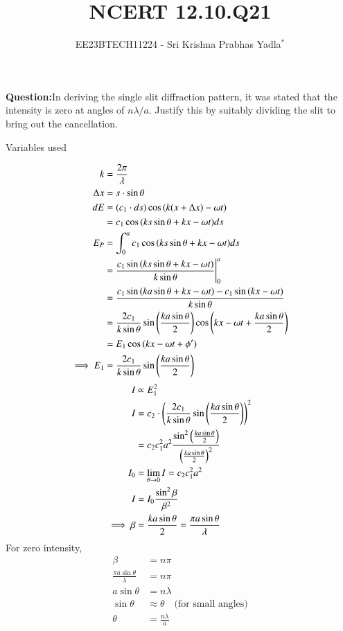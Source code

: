\documentclass[journal,12pt,twocolumn]{IEEEtran}
\theoremstyle{remark}
\begin{document}

\vspace{3cm}

\title{NCERT 12.10.Q21}
\author{EE23BTECH11224 - Sri Krishna Prabhas Yadla$^{*}$%
}
\maketitle
\newpage
\bigskip

\renewcommand{\thefigure}{\arabic{figure}}
\renewcommand{\thetable}{\arabic{table}}


\vspace{3cm}
\textbf{Question:}In deriving the single slit diffraction pattern, it was stated that the intensity is zero at angles of $n\lambda/a$. Justify this by suitably dividing the slit to bring out the cancellation.
\\
\solution
\begin{table}[htbp]
\centering
\def\arraystrech{1.5}

\caption{Variables used}
\label{tab:1.12_10_Q21}
\end{table}
\begin{align}
    k &= \frac{2\pi}{\lambda} \\
\Delta x &= s\cdot \sin{\theta}\\
    dE &= (c_1\cdot ds)\cos{(k(x+\Delta x)-\omega t)} \\
    &= c_1 \cos{(ks\sin{\theta} + kx-\omega t)} ds \\
    E_P &= \int_{0}^{a} c_1\cos{(ks\sin{\theta} + kx-\omega t)} ds \\
    &= \frac{c_1 \sin{(ks\sin{\theta} + kx-\omega t)}}{k\sin{\theta}}\Bigg|_{0}^{a}   \\
    &= \frac{c_1 \sin{(ka\sin{\theta} + kx-\omega t)}-c_1\sin{(kx-\omega t)}}{k\sin{\theta}} \\
    &= \frac{2c_1}{k\sin{\theta}}\sin{ \ensuremath{\left(\frac{ka\sin{\theta}}{2}\right)}}\cos{\ensuremath{\left(kx-\omega t+ \frac{ka\sin{\theta}}{2}\right)}} \\
    &= E_1 \cos{(kx-\omega t+ \phi')} \\
    \implies E_1 &= \frac{2c_1}{k\sin{\theta}}\sin{ \ensuremath{\left(\frac{ka\sin{\theta}}{2}\right)}}
\end{align}
\begin{align}
    I &\propto E_1^2  \\
    I &= c_2 \cdot \left(\frac{2c_1}{k\sin{\theta}}\sin{ \ensuremath{\left( \frac{ka\sin{\theta}}{2}\right)}}\right)^2 \\
    &= c_2c_1^2a^2 \frac{\sin^2{\left(\frac{ka\sin{\theta}}{2}\right)}}{\left(\frac{ka\sin{\theta}}{2}\right)^2}\\
    I_0 &= \lim_{\theta\to 0} I = c_2c_1^2a^2   \\
    I &= I_0 \frac{\sin^2{\beta}}{\beta^2}  \\
\implies    \beta &= \frac{ka\sin{\theta}}{2} = \frac{\pi a\sin{\theta}}{\lambda}
\end{align}
For zero intensity,
\begin{align}
    \beta &= n\pi \\
    \frac{\pi a\sin{\theta}}{\lambda} &= n\pi \\
    a\sin{\theta} &= n\lambda \\
    \sin{\theta} &\approx \theta \quad \text{(for small angles)} \\
    \theta &= \frac{n\lambda}{a}
\end{align}
\end{document}
